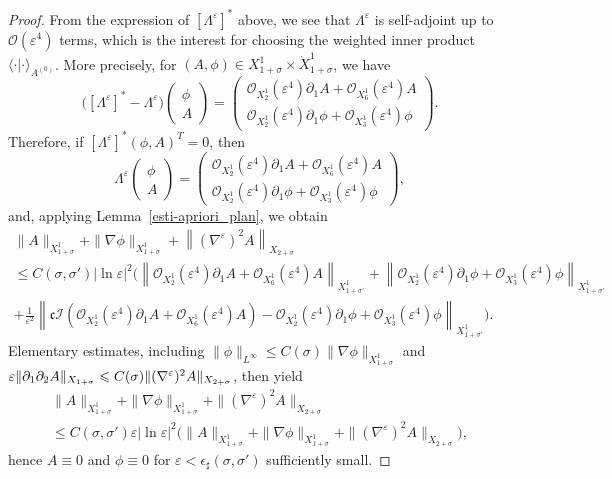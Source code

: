 \documentclass[AHL,Unicode,longabstracts,published]{cedram}
\newcommand*\p{\partial}
\newcommand*\BO{\mathcal{O}}
\newcommand*\BI{\mathcal{I}}
\newcommand*\cs{{\mathfrak c}}
\newcommand*\ii{\infty}
\newcommand*\ls{\leqslant }
\newcommand*\e{\varepsilon}
\newcommand*\ep{\epsilon}
\newcommand*\lne{\lvert \ln \varepsilon \rvert}
\newcommand*\s{\sigma}
\begin{document}
\begin{proof}
From the expression of $ [\Lambda^\e]^* $ above, we see that $ \Lambda^\e $ is self-adjoint up to $ \BO(\e^4) $ terms, which is the interest for choosing the weighted inner product $ \langle \cdot | \cdot \rangle_{A^{(0)}} $. More precisely, for $ (A, \phi) \in X^1_{1+\s} \times \dot{X}^1_{1+\s} $, we have
\begin{equation}\label{diff_adj}
\Big([\Lambda^\e]^* - \Lambda^\e \Big)
\begin{pmatrix}
\phi \\ A
\end{pmatrix} =
\begin{pmatrix}
\BO_{X^1_2} (\e^4) \p_1 A + \BO_{X^1_6} (\e^4) A
\\
\BO_{X^1_2} (\e^4) \p_1 \phi + \BO_{X^1_3} (\e^4) \phi
\end{pmatrix}.
\end{equation}
Therefore, if $ [\Lambda^\e]^* (\phi, A)^T = 0 $, then
\begin{equation*}
\Lambda^\e
\begin{pmatrix}
\phi \\ A
\end{pmatrix} =
\begin{pmatrix}
\BO_{X^1_2} (\e^4) \p_1 A + \BO_{X^1_6} (\e^4) A
\\
\BO_{X^1_2} (\e^4) \p_1 \phi + \BO_{X^1_3} (\e^4) \phi
\end{pmatrix},
\end{equation*}
and, applying Lemma~\ref{esti-apriori_plan}, we obtain
\begin{multline*}
\| A \|_{X^1_{1+\s} } + \| \nabla \phi \|_{X^1_{1+\s} } + \left\| (\nabla^\e)^2 A\right\|_{X_{2+\s}}
\\
\ls C(\s, \s') \lne^2 \Big(\left\| \BO_{X^1_2} (\e^4) \p_1 A + \BO_{X^1_6} (\e^4) A \right\|_{X^1_{1+\s'} } + \left\| \BO_{X^1_2} (\e^4) \p_1 \phi + \BO_{X^1_3} (\e^4) \phi \right\|_{X^1_{1+\s'} }
\\
+ \frac{1}{\e^2} \left\| \cs \BI (\BO_{X^1_2} (\e^4) \p_1 A + \BO_{X^1_6} (\e^4) A) - \BO_{X^1_2} (\e^4) \p_1 \phi + \BO_{X^1_3} (\e^4) \phi \right\|_{X^1_{1+\s'}} \bigg).
\end{multline*}
Elementary estimates, including $ \| \phi \|_{L^\ii} \ls C(\s) \| \nabla \phi \|_{X^1_{1+\s} } $ and $ \e \| \p_1 \p_2 A \|_{X_{1+\s}}\linebreak \ls C(\s) \| (\nabla^\e)^2 A \|_{X_{2+\s}} $, then yield
\begin{multline*}
\| A \|_{X^1_{1+\s} } + \| \nabla \phi \|_{X^1_{1+\s} } + \| (\nabla^\e)^2 A \|_{X_{2+\s}}
\\  \ls C(\s, \s') \e \lne^2 \Big(\| A \|_{X^1_{1+\s} } + \| \nabla \phi \|_{X^1_{1+\s} } + \| (\nabla^\e)^2 A \|_{X_{2+\s}} \Big),
\end{multline*}
hence $ A \equiv 0 $ and $ \phi \equiv 0 $ for $ \e < \ep_\sharp (\s, \s') $ sufficiently small.
\end{proof}
\end{document}

